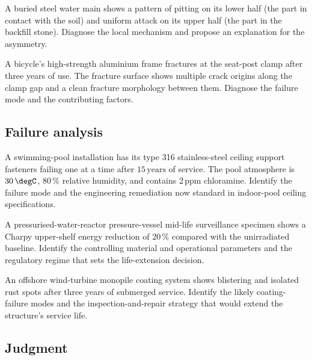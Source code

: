 \begin{exercise}
A buried steel water main shows a pattern of pitting on its lower
half (the part in contact with the soil) and uniform attack on its
upper half (the part in the backfill stone). Diagnose the local
mechanism and propose an explanation for the asymmetry.
\end{exercise}

\begin{exercise}
A bicycle's high-strength aluminium frame fractures at the seat-post
clamp after three years of use. The fracture surface shows multiple
crack origins along the clamp gap and a clean fracture morphology
between them. Diagnose the failure mode and the contributing factors.
\end{exercise}

\subsection*{Failure analysis}

\begin{exercise}
A swimming-pool installation has its type 316 stainless-steel ceiling
support fasteners failing one at a time after $15\,\text{years}$ of
service. The pool atmosphere is $30\,\degC$, $80\,\%$ relative humidity,
and contains $2\,\text{ppm}$ chloramine. Identify the failure mode and
the engineering remediation now standard in indoor-pool ceiling
specifications.
\end{exercise}

\begin{exercise}
A pressurised-water-reactor pressure-vessel mid-life surveillance
specimen shows a Charpy upper-shelf energy reduction of $20\,\%$
compared with the unirradiated baseline. Identify the controlling
material and operational parameters and the regulatory regime that
sets the life-extension decision.
\end{exercise}

\begin{exercise}
An offshore wind-turbine monopile coating system shows blistering and
isolated rust spots after three years of submerged service. Identify
the likely coating-failure modes and the inspection-and-repair
strategy that would extend the structure's service life.
\end{exercise}

\subsection*{Judgment}

